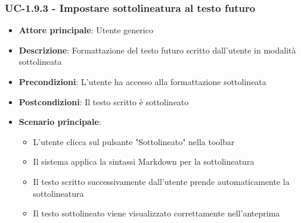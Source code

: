 \documentclass[11pt,a4paper]{article}
\begin{document}
\subsubsection{UC-1.9.3 - Impostare sottolineatura al testo futuro}
\begin{itemize}
    \item \textbf{Attore principale}: Utente generico
    \item \textbf{Descrizione}: Formattazione del testo futuro scritto dall’utente in modalità sottolineata

    \item \textbf{Precondizioni}: L’utente ha accesso alla formattazione sottolineata
    \item \textbf{Postcondizioni}: Il testo scritto è sottolineato
    \item \textbf{Scenario principale}:
        \begin{itemize}
            \item L’utente clicca sul pulsante "Sottolineato" nella toolbar
            \item Il sistema applica la sintassi Markdown per la sottolineatura
            \item Il testo scritto successivamente dall'utente prende automaticamente la sottolineatura
            \item Il testo sottolineato viene visualizzato correttamente nell'anteprima
        \end{itemize}
\end{itemize}
\end{document}
